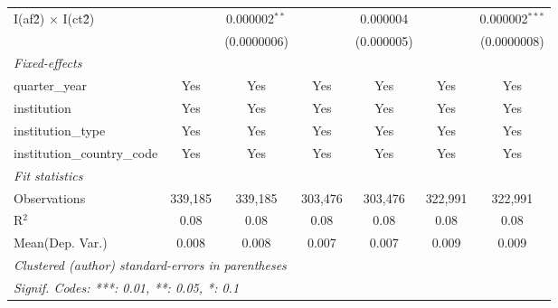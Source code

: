 \begin{tabular}{lcccccc}
   I(af\^2) $\times$ I(ct\^2)         &               & 0.000002$^{**}$  &                & 0.000004        &               & 0.000002$^{***}$\\   
                                      &               & (0.0000006)      &                & (0.000005)      &               & (0.0000008)\\   
   \midrule
   \emph{Fixed-effects}\\
   quarter\_year                      & Yes           & Yes              & Yes            & Yes             & Yes           & Yes\\  
   institution                        & Yes           & Yes              & Yes            & Yes             & Yes           & Yes\\  
   institution\_type                  & Yes           & Yes              & Yes            & Yes             & Yes           & Yes\\  
   institution\_country\_code         & Yes           & Yes              & Yes            & Yes             & Yes           & Yes\\  
   \midrule
   \emph{Fit statistics}\\
   Observations                       & 339,185       & 339,185          & 303,476        & 303,476         & 322,991       & 322,991\\  
   R$^2$                              & 0.08          & 0.08             & 0.08           & 0.08            & 0.08          & 0.08\\  
Mean(Dep. Var.) & 0.008 & 0.008 & 0.007 & 0.007 & 0.009 & 0.009 \\
   \midrule \midrule
   \multicolumn{7}{l}{\emph{Clustered (author) standard-errors in parentheses}}\\
   \multicolumn{7}{l}{\emph{Signif. Codes: ***: 0.01, **: 0.05, *: 0.1}}\\
\end{tabular}
\par\endgroup
